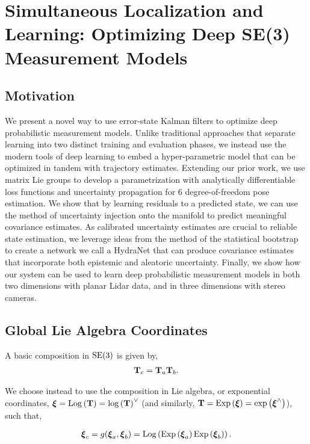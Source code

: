 \chapter{Simultaneous Localization and Learning: Optimizing Deep SE(3) Measurement Models}

\section{Motivation}

We present a novel way to use error-state Kalman filters to optimize deep probabilistic measurement models. Unlike traditional approaches that separate learning into two distinct training and evaluation phases, we instead use the modern tools of deep learning to embed a hyper-parametric model that can be optimized in tandem with trajectory estimates. Extending our prior work, we use matrix Lie groups to develop a parametrization with analytically differentiable loss functions and uncertainty propagation for 6 degree-of-freedom pose estimation. We show that by learning residuals to a predicted state, we can use the method of uncertainty injection onto the manifold to predict meaningful covariance estimates. As calibrated uncertainty estimates are crucial to reliable state estimation, we leverage ideas from the method of the statistical bootstrap to create a network we call a HydraNet that can produce covariance estimates that incorporate both epistemic and aleatoric uncertainty. Finally, we show how our system can be used to learn deep probabilistic measurement models in both two dimensions with planar Lidar data, and in three dimensions with stereo cameras.


\section{Global Lie Algebra Coordinates}

A basic composition in $\mathrm{SE}(3)$ is given by,
\begin{align}
\boldsymbol{\mathbf{T}}_c = \boldsymbol{\mathbf{T}}_a \boldsymbol{\mathbf{T}}_b.
\end{align}

We choose instead to use the composition in Lie algebra, or exponential coordinates, $\boldsymbol{\mathbf{\xi}} = \mathrm{Log}\left({\boldsymbol{\mathbf{T}}}\right) = \mathrm{log}\left({\boldsymbol{\mathbf{T}}}\right)^{\vee}$ (and similarly, $\boldsymbol{\mathbf{T}} = \mathrm{Exp}\left({\boldsymbol{\mathbf{\xi}}}\right) = \mathrm{exp}\left({\boldsymbol{\mathbf{\xi}}}^{\wedge}\right)$), such that,

\begin{align}
\boldsymbol{\mathbf{\xi}}_c = g(\boldsymbol{\mathbf{\xi}}_a, \boldsymbol{\mathbf{\xi}}_b) = \mathrm{Log}\left({\mathrm{Exp}\left({\boldsymbol{\mathbf{\xi}}_a}\right) \mathrm{Exp}\left({\boldsymbol{\mathbf{\xi}}_b}\right)}\right).
\end{align}

